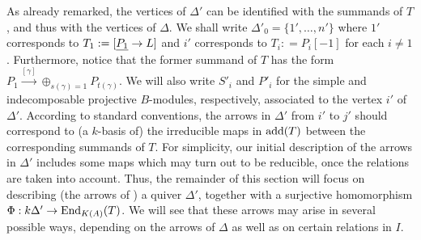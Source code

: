 \documentclass{amsart}
\begin{document}
  As already remarked, the vertices of $\Delta'$ can be identified with the summands of $T$, and thus with the vertices of $\Delta$.  We shall write $\Delta'_0 = \{1', \ldots, n'\}$ where $1'$ corresponds to $T_1 := [\underline{P_1} \rightarrow L]$ and $i'$ corresponds to $T_i : = P_i[-1]$ for each $i \neq 1$.  Furthermore, notice that the former summand of $T$ has the form $P_1 \stackrel{[\gamma]}{\longrightarrow} \oplus_{s(\gamma)=1} P_{t(\gamma)}$.  We will also write $S'_i$ and $P'_i$ for the simple and indecomposable projective $B$-modules, respectively, associated to the vertex $i'$ of $\Delta'$.  
According to standard conventions, the arrows in $\Delta'$ from $i'$ to $j'$ should correspond to (a $k$-basis of) the irreducible maps in $\mathrm{add}(T)$ between the corresponding summands of $T$.  For simplicity, our initial description of the arrows in $\Delta'$ includes some maps which may turn out to be reducible, once the relations are taken into account.  Thus, the remainder of this section will focus on describing (the arrows of ) a quiver $\Delta'$, together with a surjective homomorphism $\Phi : k\Delta' \rightarrow \mathrm{End}_{K(A)}(T)$.  We will see that these arrows may arise in several possible ways, depending on the arrows of $\Delta$ as well as on certain relations in $I$.  
\end{document}
